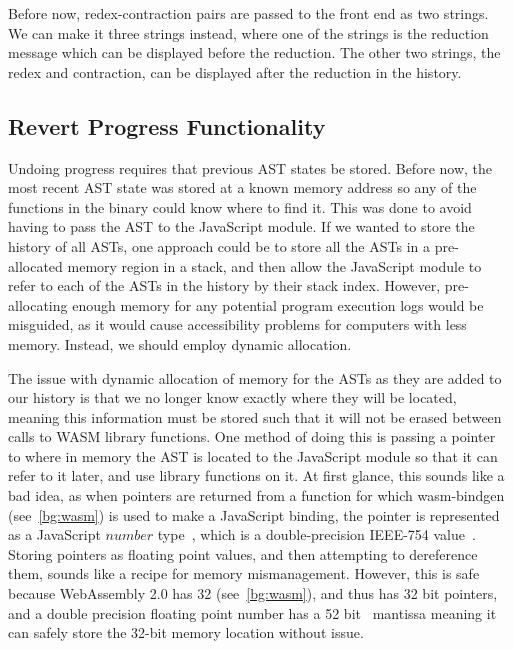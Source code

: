 \noindent Before now, redex-contraction pairs are passed to the front end as two strings. We can make it three strings instead, where one of the strings is the reduction message which can be displayed before the reduction. The other two strings, the redex and contraction, can be displayed after the reduction in the history. 

\subsection{Revert Progress Functionality}

Undoing progress requires that previous \ac{AST} states be stored. Before now, the most recent \ac{AST} state was stored at a known memory address so any of the functions in the binary could know where to find it. This was done to avoid having to pass the \ac{AST} to the JavaScript module. If we wanted to store the history of all \ac{AST}s, one approach could be to store all the \ac{AST}s in a pre-allocated memory region in a stack, and then allow the JavaScript module to refer to each of the \ac{AST}s in the history by their stack index. However, pre-allocating enough memory for any potential program execution logs would be misguided, as it would cause accessibility problems for computers with less memory. Instead, we should employ dynamic allocation. 

The issue with dynamic allocation of memory for the \ac{AST}s as they are added to our history is that we no longer know exactly where they will be located, meaning this information must be stored such that it will not be erased between calls to \ac{WASM} library functions. One method of doing this is passing a pointer to where in memory the \ac{AST} is located to the JavaScript module so that it can refer to it later, and use library functions on it. At first glance, this sounds like a bad idea, as when pointers are returned from a function for which wasm-bindgen (see~\ref{bg:wasm}) is used to make a JavaScript binding, the pointer is represented as a JavaScript $number$ type~\cite{wasm_bindgen_guide}, which is a double-precision IEEE-754 value~\cite{ecma262number}. Storing pointers as floating point values, and then attempting to dereference them, sounds like a recipe for memory mismanagement. However, this is safe because WebAssembly 2.0 has 32 (see~\ref{bg:wasm}), and thus has 32 bit pointers, and a double precision floating point number has a 52 bit~\cite{ieee754} mantissa meaning it can safely store the 32-bit memory location without issue. 

